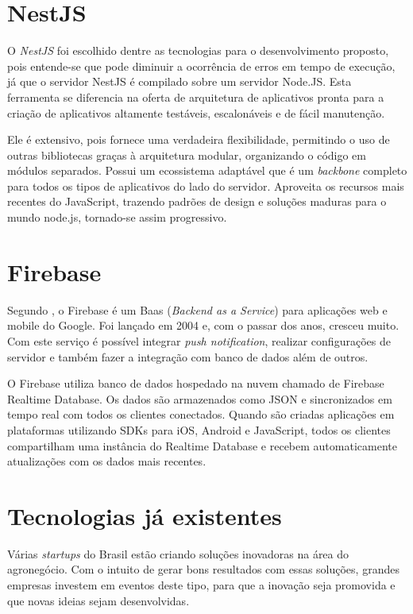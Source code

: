 \section{NestJS}
O \textit{NestJS} foi escolhido dentre as tecnologias para o desenvolvimento proposto, pois entende-se que pode diminuir a ocorrência de erros em tempo de execução, já que o servidor NestJS é compilado sobre um servidor Node.JS. Esta ferramenta se diferencia na oferta de arquitetura de aplicativos pronta para a criação de aplicativos altamente testáveis, escalonáveis e de fácil manutenção.

Ele é extensivo, pois fornece uma verdadeira flexibilidade, permitindo o uso de outras bibliotecas graças à arquitetura modular, organizando o código em módulos separados. Possui um ecossistema adaptável que é um \textit{backbone} completo para todos os tipos de aplicativos do lado do servidor. Aproveita os recursos mais recentes do JavaScript, trazendo padrões de design e soluções maduras para o mundo node.js, tornado-se assim progressivo. \cite{nest}

\section{Firebase}
Segundo , o Firebase é um Baas (\textit{Backend as a Service}) para aplicações web e mobile do Google. Foi lançado em 2004 e, com o passar dos anos, cresceu muito. Com este serviço é possível integrar \textit{push notification}, realizar configurações de servidor e também fazer a integração com banco de dados além de outros.

O Firebase utiliza banco de dados hospedado na nuvem chamado de Firebase Realtime Database. Os dados são armazenados como JSON e sincronizados em tempo real com todos os clientes conectados. Quando são criadas aplicações em plataformas utilizando SDKs para iOS, Android e JavaScript, todos os clientes compartilham uma instância do Realtime Database e recebem automaticamente atualizações com os dados mais recentes.  \cite{firebase1} 

\section{Tecnologias já existentes}
Várias \textit{startups} do Brasil estão criando soluções inovadoras na área do agronegócio. Com o intuito de gerar bons resultados com essas soluções, grandes empresas investem em eventos deste tipo, para que a inovação seja promovida e que novas ideias sejam desenvolvidas.

